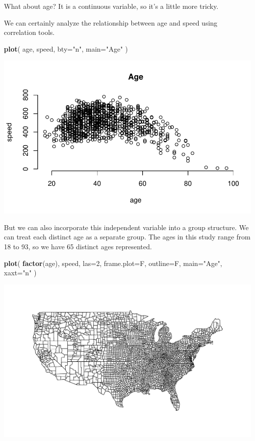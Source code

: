 \documentclass[]{book}
\newenvironment{Shaded}{\begin{snugshade}}{\end{snugshade}}
\newcommand{\DataTypeTok}[1]{\textcolor[rgb]{0.13,0.29,0.53}{#1}}
\newcommand{\DecValTok}[1]{\textcolor[rgb]{0.00,0.00,0.81}{#1}}
\newcommand{\KeywordTok}[1]{\textcolor[rgb]{0.13,0.29,0.53}{\textbf{#1}}}
\newcommand{\NormalTok}[1]{#1}
\newcommand{\StringTok}[1]{\textcolor[rgb]{0.31,0.60,0.02}{#1}}
\theoremstyle{definition}
\theoremstyle{definition}
\theoremstyle{definition}
\theoremstyle{remark}
\begin{document}
What about age? It is a continuous variable, so it's a little more
tricky.

We can certainly analyze the relationship between age and speed using
correlation tools.

\begin{Shaded}
\begin{Highlighting}[]
\KeywordTok{plot}\NormalTok{( age, speed, }\DataTypeTok{bty=}\StringTok{"n"}\NormalTok{, }\DataTypeTok{main=}\StringTok{"Age"}\NormalTok{ )}
\end{Highlighting}
\end{Shaded}

\begin{center}\includegraphics[width=0.7\linewidth]{DS4PS-I_files/figure-latex/unnamed-chunk-141-1} \end{center}

But we can also incorporate this independent variable into a group
structure. We can treat each distinct age as a separate group. The ages
in this study range from 18 to 93, so we have 65 distinct ages
represented.

\begin{Shaded}
\begin{Highlighting}[]

\KeywordTok{plot}\NormalTok{( }\KeywordTok{factor}\NormalTok{(age), speed, }\DataTypeTok{las=}\DecValTok{2}\NormalTok{, }\DataTypeTok{frame.plot=}\NormalTok{F, }\DataTypeTok{outline=}\NormalTok{F, }\DataTypeTok{main=}\StringTok{"Age"}\NormalTok{, }\DataTypeTok{xaxt=}\StringTok{"n"}\NormalTok{  )}
\end{Highlighting}
\end{Shaded}

\begin{center}\includegraphics[width=0.7\linewidth]{DS4PS-I_files/figure-latex/unnamed-chunk-142-1} \end{center}
\end{document}
